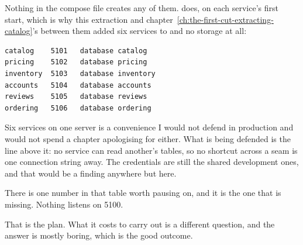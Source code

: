 Nothing in the compose file creates any of them.  does,
on each service's first start, which is why this extraction and
chapter~\ref{ch:the-first-cut-extracting-catalog}'s between them added six
services to  and no storage at all:

\begin{verbatim}
catalog    5101   database catalog
pricing    5102   database pricing
inventory  5103   database inventory
accounts   5104   database accounts
reviews    5105   database reviews
ordering   5106   database ordering
\end{verbatim}

Six services on one server is a convenience I would not defend in production and
would not spend a chapter apologising for either. What is being defended is the
line above it: no service can read another's tables, so no shortcut across a
seam is one connection string away. The credentials are still the shared
development ones, and that would be a finding anywhere but here.

There is one number in that table worth pausing on, and it is the one that is
missing. Nothing listens on 5100.

\medskip
That is the plan. What it costs to carry out is a different question, and the
answer is mostly boring, which is the good outcome.

%
